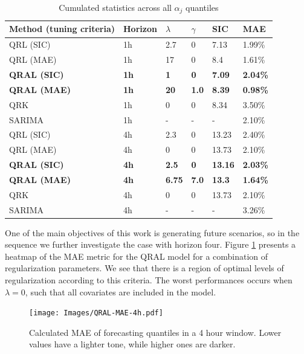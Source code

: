 \begin{table}[]
	\centering
	\caption{Cumulated statistics across all $\alpha_j$ quantiles}
	\label{tab:results-icaraizinho}	
	\begin{tabular}{llllll}
		\hline
		Method (tuning criteria) & Horizon     & $\lambda$     & $\gamma$     & SIC            & MAE             \\ \hline
		QRL (SIC)                & 1h          & 2.7           & 0            & 7.13           & 1.99\%          \\
		QRL (MAE)                & 1h          & 17            & 0            & 8.4            & 1.61\%          \\
		\textbf{QRAL (SIC)}      & \textbf{1h} & \textbf{1}    & \textbf{0}   & \textbf{7.09}  & \textbf{2.04\%} \\
		\textbf{QRAL (MAE)}      & \textbf{1h} & \textbf{20}   & \textbf{1.0} & \textbf{8.39}  & \textbf{0.98\%} \\
		QRK                      & 1h          & 0             & 0            & 8.34           & 3.50\%          \\
		SARIMA                   & 1h          & -             & -            & -              & 2.10\%          \\ \hline
		QRL (SIC)                & 4h          & 2.3           & 0            & 13.23          & 2.40\%          \\
		QRL (MAE)                & 4h          & 0             & 0            & 13.73          & 2.10\%          \\
		\textbf{QRAL (SIC)}      & \textbf{4h} & \textbf{2.5}  & \textbf{0}   & \textbf{13.16} & \textbf{2.03\%} \\
		\textbf{QRAL (MAE)}      & \textbf{4h} & \textbf{6.75} & \textbf{7.0} & \textbf{13.3}  & \textbf{1.64\%} \\
		QRK                      & 4h          & 0             & 0            & 13.73          & 2.10\%          \\
		SARIMA                   & 4h          & -             & -            & -              &     3.26\%            \\ \hline
		\end{tabular}
\end{table}


One of the main objectives of this work is generating future scenarios, so in the sequence we further investigate the case with horizon four. Figure \ref{fig:heatmap-qral-mae} presents a heatmap of the MAE metric for the QRAL model for a combination of regularization parameters. We see that there is a region of optimal levels of regularization according to this criteria. The worst performances occurs when $\lambda = 0$, such that all covariates are included in the model.
\begin{figure}[ht]
	\centering
	\texttt{[image: Images/QRAL-MAE-4h.pdf]}
	\caption{Calculated MAE of forecasting quantiles in a 4 hour window. Lower values have a lighter tone, while higher ones are darker.}
	\label{fig:heatmap-qral-mae}
\end{figure}


